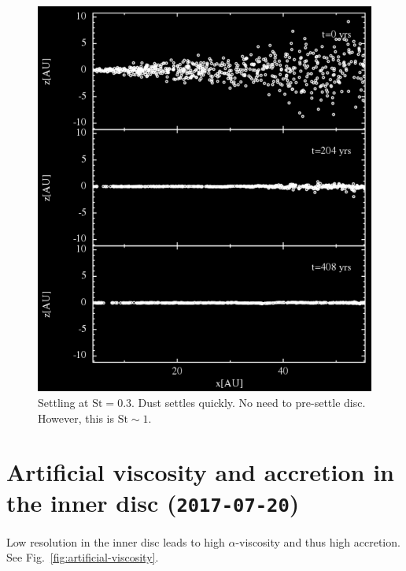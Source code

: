 \documentclass[usenatbib,a4paper,times,fleqn]{mnras}
\newcommand{\st}{\mathrm{St}}
\begin{document}
\begin{figure}
   \begin{center}
      \includegraphics[width=0.95\columnwidth]{figs/settling-St-3e-1.png}
      \caption{Settling at $\st{} = 0.3$. Dust settles quickly. No need to
      pre-settle disc. However, this is $\st{}\sim 1$.}
      \label{fig:dust-settling}
   \end{center}
\end{figure}

\section*{Artificial viscosity and accretion in the inner disc
(\texttt{2017-07-20})}

Low resolution in the inner disc leads to high $\alpha$-viscosity and thus high
accretion. See Fig.~\ref{fig:artificial-viscosity}.
\end{document}
